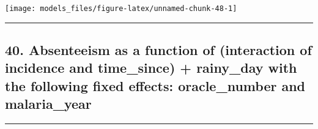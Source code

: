 \documentclass[]{article}
\begin{document}
\begin{center}\texttt{[image: models\_files/figure-latex/unnamed-chunk-48-1]} \end{center}

\newpage

\begin{center}\rule{0.5\linewidth}{\linethickness}\end{center}

\subsection{40. Absenteeism as a function of (interaction of incidence
and time\_since) + rainy\_day with the following fixed effects:
oracle\_number and
malaria\_year}\label{absenteeism-as-a-function-of-interaction-of-incidence-and-time_since-rainy_day-with-the-following-fixed-effects-oracle_number-and-malaria_year}

\begin{center}\rule{0.5\linewidth}{\linethickness}\end{center}
\end{document}
